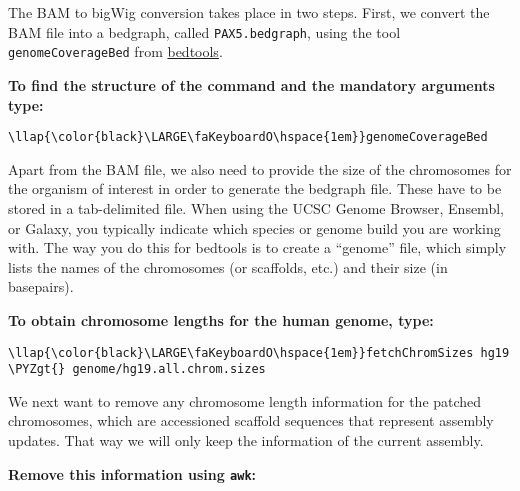 \documentclass[11pt]{article}
\def\PYZgt{\char`\>}
\begin{document}
The BAM to bigWig conversion takes place in two steps. First, we convert
the BAM file into a bedgraph, called \texttt{PAX5.bedgraph}, using the
tool \texttt{genomeCoverageBed} from
\href{https://bedtools.readthedocs.io/en/latest/}{bedtools}.

\textbf{To find the structure of the command and the mandatory arguments
type:}





\begin{terminalinput}
\begin{Verbatim}[commandchars=\\\{\}]
\llap{\color{black}\LARGE\faKeyboardO\hspace{1em}}genomeCoverageBed
\end{Verbatim}
\end{terminalinput}



    Apart from the BAM file, we also need to provide the size of the
chromosomes for the organism of interest in order to generate the
bedgraph file. These have to be stored in a tab-delimited file. When
using the UCSC Genome Browser, Ensembl, or Galaxy, you typically
indicate which species or genome build you are working with. The way you
do this for bedtools is to create a ``genome'' file, which simply lists
the names of the chromosomes (or scaffolds, etc.) and their size (in
basepairs).

\textbf{To obtain chromosome lengths for the human genome, type:}





\begin{terminalinput}
\begin{Verbatim}[commandchars=\\\{\}]
\llap{\color{black}\LARGE\faKeyboardO\hspace{1em}}fetchChromSizes hg19 \PYZgt{} genome/hg19.all.chrom.sizes
\end{Verbatim}
\end{terminalinput}



    We next want to remove any chromosome length information for the patched
chromosomes, which are accessioned scaffold sequences that represent
assembly updates. That way we will only keep the information of the
current assembly.

\textbf{Remove this information using \texttt{awk}:}
\end{document}
